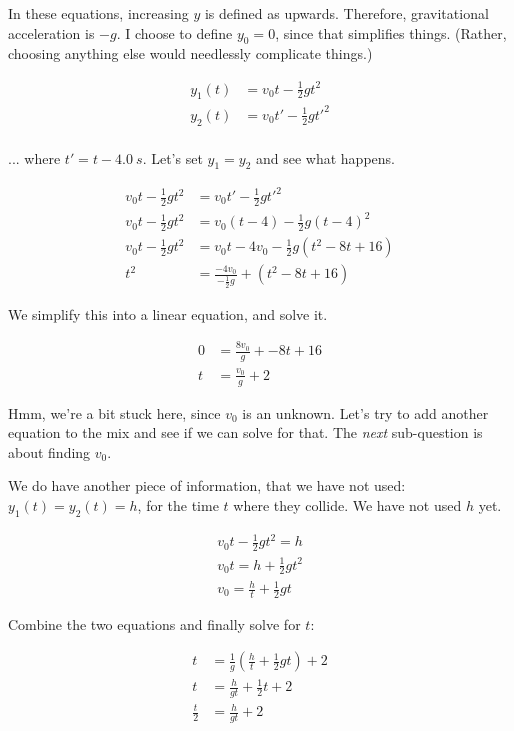 \documentclass[8.01x]{subfiles}
\begin{document}
In these equations, increasing $y$ is defined as upwards. Therefore, gravitational acceleration is $-g$. I choose to define $y_0 = 0$, since that simplifies things. (Rather, choosing anything else would needlessly complicate things.)

\begin{align}
 y_1(t) &= v_0 t - \frac{1}{2} g t^2\\
 y_2(t) &= v_0 t' - \frac{1}{2} g t'^2\\
\end{align}

... where $t' = t - \SI{4.0}{s}$.
Let's set $y_1 = y_2$ and see what happens.

\begin{align}
v_0 t - \frac{1}{2} g t^2 &= v_0 t' - \frac{1}{2} g t'^2\\
v_0 t - \frac{1}{2} g t^2 &= v_0 (t - 4) - \frac{1}{2} g (t - 4)^2\\
v_0 t - \frac{1}{2} g t^2 &= v_0 t - 4 v_0 - \frac{1}{2} g (t^2 -8t + 16)\\
t^2 &= \frac{- 4 v_0}{- \frac{1}{2} g} + (t^2 -8t + 16)
\end{align}

We simplify this into a linear equation, and solve it.

\begin{align}
0 &= \frac{8v_0}{g} + -8t + 16\\
t &= \frac{v_0}{g} + 2
\end{align}

Hmm, we're a bit stuck here, since $v_0$ is an unknown. Let's try to add another equation to the mix and see if we can solve for that. The \emph{next} sub-question is about finding $v_0$.

We do have another piece of information, that we have not used: $y_1(t) = y_2(t) = h$, for the time $t$ where they collide. We have not used $h$ yet.

\begin{align}
v_0 t - \frac{1}{2} g t^2 = h\\
v_0 t = h + \frac{1}{2} g t^2\\
v_0 = \frac{h}{t} + \frac{1}{2} g t \label{h1p8:v0}
\end{align}

Combine the two equations and finally solve for $t$:

\begin{align}
t &= \frac{1}{g} \left(\frac{h}{t} + \frac{1}{2} g t\right) + 2\\
t &= \frac{h}{gt} + \frac{1}{2} t + 2\\
\frac{t}{2} &= \frac{h}{gt} + 2
\end{align}
\end{document}
